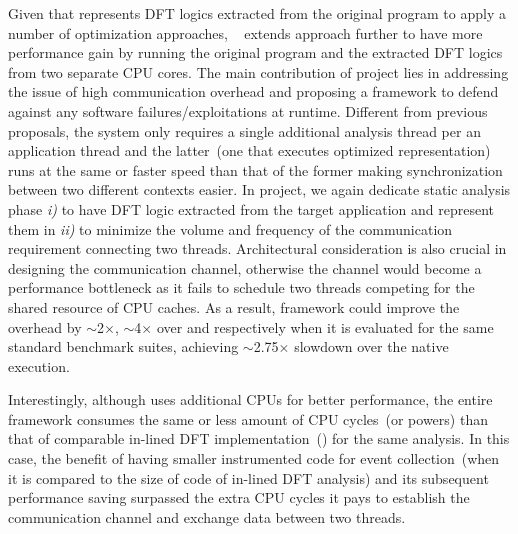 \documentclass[letterpaper, 10pt]{article}
\begin{document}
\begin{small}
%
Given that \TFA represents DFT logics extracted from the original program to
apply a number of optimization approaches, \SR~\cite{sreplica:2013ccs} extends
\TFA approach further to have more performance gain by running the original
program and the extracted DFT logics from two separate CPU cores.
%
%
The main contribution of \SR project lies in addressing the issue of high
communication overhead and proposing a framework  to defend against any
software failures/exploitations at runtime. Different from previous proposals,
the system only requires a single additional analysis thread per an application
thread and the latter~(one that executes optimized \TFA representation) runs at
the same or faster speed than that of the former making synchronization between
two different contexts easier.
%
In \SR project, we again dedicate static analysis phase {\it i)} to have DFT
logic extracted from the target application and represent them in \TFA
\xspace{\it ii)} to minimize the volume and frequency of the communication
requirement connecting two threads.
%
Architectural consideration is also crucial in designing the communication
channel, otherwise the channel would become a performance bottleneck as it
fails to schedule two threads competing for the shared resource of CPU caches.
%
As a result, \SR framework could improve the overhead by $\sim$2$\times$,
$\sim$4$\times$ over \TFA and \libdft respectively when it is evaluated for the
same standard benchmark suites, achieving $\sim$2.75$\times$ slowdown over the
native execution.

Interestingly, although \SR uses additional CPUs for better performance, the
entire framework consumes the same or less amount of CPU cycles~(or powers)
than that of comparable in-lined DFT implementation~(\TFA) for the same
analysis.
%
In this case, the benefit of having smaller instrumented code for event
collection~(when it is compared to the size of code of in-lined DFT analysis)
and its subsequent performance saving surpassed the extra CPU cycles it pays to
establish the communication channel and exchange data between two threads.


\end{small}
\end{document}
